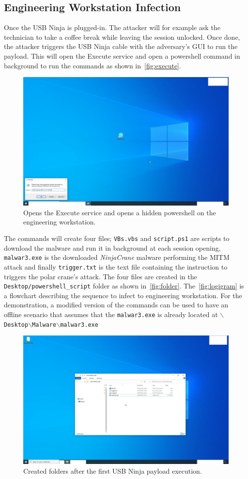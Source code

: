 \subsection{Engineering Workstation Infection}

Once the USB Ninja is plugged-in. The attacker will for example ask the technician to take a coffee break while leaving the session unlocked. Once done, the attacker triggers the USB Ninja cable with the adversary's GUI to run the payload. This will open the Execute service and open a powershell command in background to run the commands as shown in~\autoref{fig:execute}.

\begin{figure}[H]
    \centering
    \includegraphics[trim={0cm 0cm 25cm 15cm}, clip, width=0.5\linewidth]{figures/execute.png}
    \caption{Opens the Execute service and opens a hidden powershell on the engineering workstation.}
    \label{fig:execute}
\end{figure}


The commands will create four files; \texttt{VBs.vbs} and \texttt{script.ps1} are scripts to download the malware and run it in background at each session opening, \texttt{malwar3.exe} is the downloaded \emph{NinjaCrane} malware performing the MITM attack and finally \texttt{trigger.txt} is the text file containing the instruction to triggers the polar crane's attack. The four files are created in the \texttt{Desktop/powershell\_script} folder as shown in~\autoref{fig:folder}. The~\autoref{fig:logigram} is a flowchart describing the sequence to infect to engineering workstation. For the demonstration, a modified version of the commands can be used to have an offline scenario that assumes that the \texttt{malwar3.exe} is already located at \texttt{$\backslash$Desktop$\backslash$Malware$\backslash$malwar3.exe}

\begin{figure}[H]
    \centering
    \includegraphics[trim={8cm 10cm 10cm 6cm}, clip, width=0.8\linewidth]{figures/folder.png}
    \caption{Created folders after the first USB Ninja payload execution.}
    \label{fig:folder}
\end{figure}

